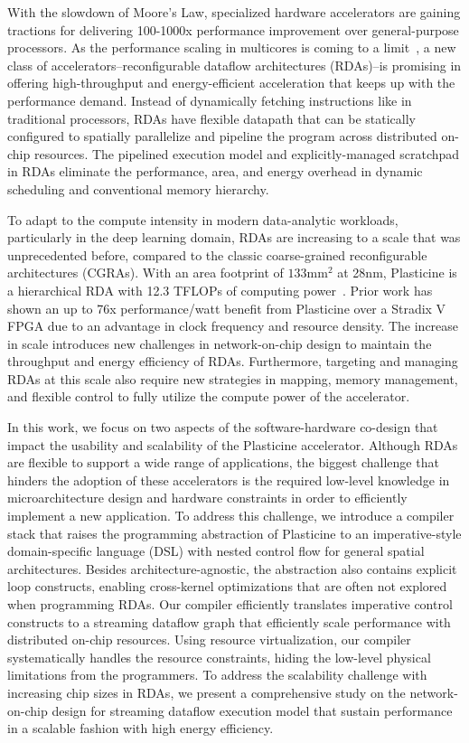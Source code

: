 
With the slowdown of Moore’s Law, specialized hardware accelerators are gaining tractions 
for delivering 100-1000x performance improvement over general-purpose processors. 
As the performance scaling in multicores is coming to a limit~\cite{multicorescale}, a new
class of accelerators--reconfigurable dataflow architectures (RDAs)--is promising in 
offering high-throughput and energy-efficient acceleration that keeps up with the performance demand.
Instead of dynamically fetching instructions like in traditional processors, RDAs have flexible datapath 
that can be statically configured to spatially parallelize and pipeline the program across
distributed on-chip resources. 
The pipelined execution model and explicitly-managed scratchpad in RDAs eliminate
the performance, area, and energy overhead in dynamic scheduling and conventional memory hierarchy.

To adapt to the compute intensity in modern data-analytic workloads, particularly in the deep learning
domain, RDAs are increasing to a scale that was unprecedented before, compared to the classic coarse-grained
reconfigurable architectures (CGRAs).
With an area footprint of $133\text{mm}^2$ at 28nm, 
Plasticine is a hierarchical RDA with 12.3 TFLOPs of computing power~\cite{plasticine}.
Prior work has shown an up to 76x performance/watt benefit from Plasticine over a Stradix V FPGA 
due to an advantage in clock frequency and resource density.
The increase in scale introduces new challenges in network-on-chip design to maintain 
the throughput and energy efficiency of RDAs.
Furthermore, targeting and managing RDAs at this scale also require new strategies in mapping, 
memory management, and flexible control to fully utilize the compute power of the accelerator. 

In this work, we focus on two aspects of the software-hardware co-design that impact the usability
and scalability of the Plasticine accelerator. 
Although RDAs are flexible to support a wide range of applications, 
the biggest challenge that hinders the adoption of these accelerators is 
the required low-level knowledge in microarchitecture design and hardware constraints in
order to efficiently implement a new application.
To address this challenge, we introduce a compiler stack that raises the programming abstraction of Plasticine to an imperative-style domain-specific language (DSL) with nested control
flow for general spatial architectures.
Besides architecture-agnostic, the abstraction also contains explicit loop constructs, enabling cross-kernel optimizations that are often not explored when programming RDAs.
Our compiler efficiently translates imperative control constructs to a streaming
dataflow graph that efficiently scale performance with distributed on-chip resources.
Using resource virtualization, our compiler systematically handles the resource constraints, hiding
the low-level physical limitations from the programmers.
To address the scalability challenge with increasing chip sizes in RDAs, 
we present a comprehensive study on the network-on-chip design 
for streaming dataflow execution model that sustain performance in a 
scalable fashion with high energy efficiency.
